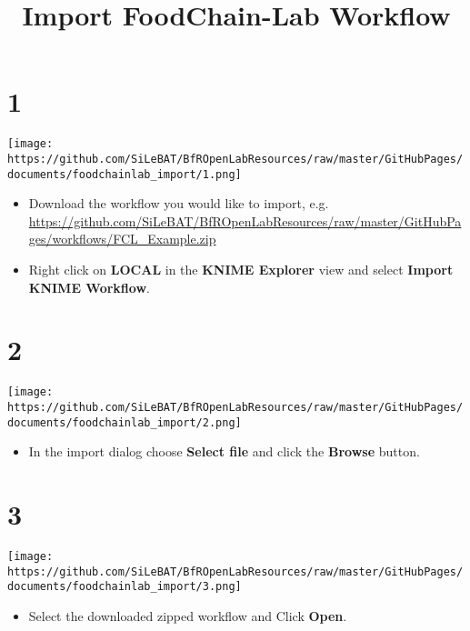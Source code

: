 \documentclass[10pt]{beamer}
\title{Import FoodChain-Lab Workflow}
\date{}
\begin{document}
\maketitle

\section{1}
\begin{frame}
	\begin{center}
  		\texttt{[image: https://github.com/SiLeBAT/BfROpenLabResources/raw/master/GitHubPages/documents/foodchainlab\_import/1.png]}
	\end{center}
	\begin{itemize}
		\item Download the workflow you would like to import, e.g.
    \url{https://github.com/SiLeBAT/BfROpenLabResources/raw/master/GitHubPages/workflows/FCL_Example.zip}
		\item Right click on \textbf{LOCAL} in the \textbf{KNIME Explorer} view and select \textbf{Import KNIME Workflow}.
	\end{itemize}
\end{frame}

\section{2}
\begin{frame}
	\begin{center}
  		\texttt{[image: https://github.com/SiLeBAT/BfROpenLabResources/raw/master/GitHubPages/documents/foodchainlab\_import/2.png]}
	\end{center}
	\begin{itemize}
		\item In the import dialog choose \textbf{Select file} and click the \textbf{Browse} button.
	\end{itemize}
\end{frame}

\section{3}
\begin{frame}
	\begin{center}
  		\texttt{[image: https://github.com/SiLeBAT/BfROpenLabResources/raw/master/GitHubPages/documents/foodchainlab\_import/3.png]}
	\end{center}
	\begin{itemize}
		\item Select the downloaded zipped workflow and Click \textbf{Open}.
	\end{itemize}
\end{frame}
\end{document}
